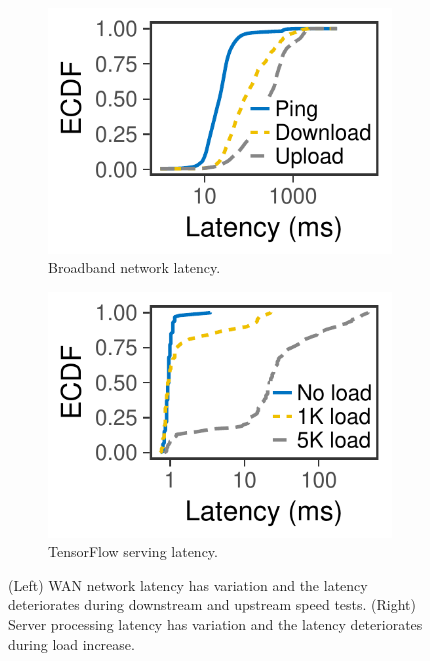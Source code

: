 \begin{figure}
  \centering
  \begin{subfigure}[t]{0.4\columnwidth}
    \centering
    \includegraphics[width=\textwidth]{figures/fcc_latency.pdf}
    \caption{Broadband network latency.}
    \label{fig:fcc-latency}
  \end{subfigure}
  \hspace{2em}
  \begin{subfigure}[t]{0.4\columnwidth}
    \centering
    \includegraphics[width=\textwidth]{figures/tf_latency.pdf}
    \caption{TensorFlow serving latency.}
    \label{fig:tf-latency}
  \end{subfigure}
  \caption{(Left) WAN network latency has variation and the latency deteriorates
    during downstream and upstream speed tests. (Right) Server processing
    latency has variation and the latency deteriorates during load increase.}
  \label{fig:variation}
\end{figure}

